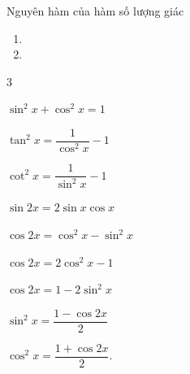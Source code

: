 \begin{dang}{Nguyên hàm của hàm số lượng giác}
	\begin{enumerate}[\iconMT]
		\item {}
		\item {}
	\end{enumerate}
\begin{enumEX}[$\bullet$]{3}
	\item $\sin^2x+\cos^2x=1$
	\item $\tan^2x=\dfrac{1}{\cos^2x}-1$
	\item $\cot^2x=\dfrac{1}{\sin^2x}-1$
	\item $\sin 2x=2\sin x \cos x$
	\item $\cos 2x=\cos^2x-\sin^2x$
	\item $\cos 2x =2\cos^2x-1$
	\item $\cos 2x= 1-2\sin^2x$
	\item $\sin^2 x=\dfrac{1-\cos 2x}{2}$
	\item $\cos^2 x=\dfrac{1+\cos 2x}{2}$.
\end{enumEX}
\end{dang}
\setcounter{vd}{0}
